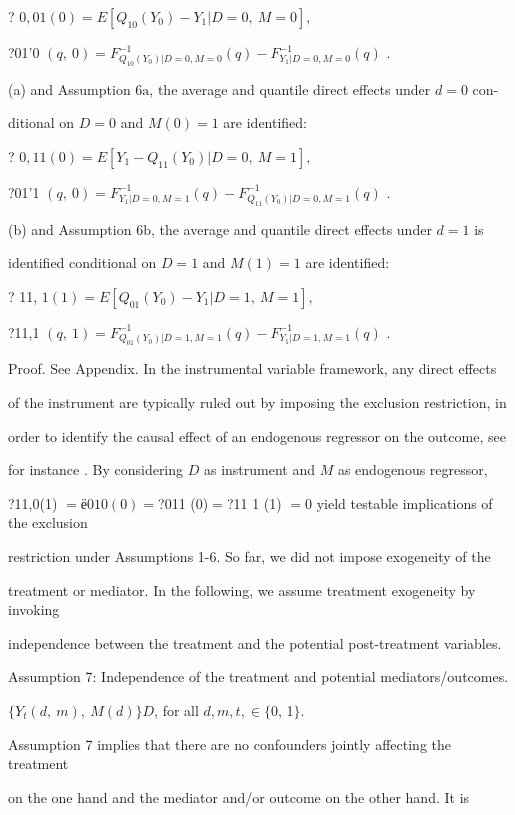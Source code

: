 \documentclass[a4paper,12pt]{article}
\begin{document}
\begin{center}
? $0,01(0)=E[Q_{10}(Y_{0})-Y_{1}|D=0,\ M=0],$

?01'0 $(q,\ 0)=F_{Q_{10}(Y_{0})|D=0,M=0}^{-1}(q)-F_{Y_{1}|D=0,M=0}^{-1}(q)$ .
\end{center}
(a) and Assumption $6\mathrm{a}$, the average and quantile direct effects under $d=0$ con-

ditional on $D=0$ and $M(0)=1$ are identified:
\begin{center}
? $0,11(0)=E[Y_{1}-Q_{11}(Y_{0})|D=0,\ M=1],$

?01'1 $(q,\ 0)=F_{Y_{1}|D=0,M=1}^{-1}(q)-F_{Q_{11}(Y_{0})|D=0,M=1}^{-1}(q)$ .
\end{center}
(b) and Assumption $6\mathrm{b}$, the average and quantile direct effects under $d = 1$ is

identified conditional on $D=1$ and $M(1)=1$ are identified:
\begin{center}
? 11, $1(1)=E[Q_{01}(Y_{0})-Y_{1}|D=1,\ M=1],$

?11,1 $(q,\ 1)=F_{Q_{01}(Y_{0})|D=1,M=1}^{-1}(q)-F_{Y_{1}|D=1,M=1}^{-1}(q)$ .
\end{center}
Proof. See Appendix. In the instrumental variable framework, any direct effects

of the instrument are typically ruled out by imposing the exclusion restriction, in

order to identify the causal effect of an endogenous regressor on the outcome, see

for instance . By considering $D$ as instrument and $M$ as endogenous regressor,

?11,0(1) $=ё 01 0(0) =$?011 (0)$=$?11 1 (1) $=0$ yield testable implications of the exclusion

restriction under Assumptions 1-6. So far, we did not impose exogeneity of the

treatment or mediator. In the following, we assume treatment exogeneity by invoking

independence between the treatment and the potential post-treatment variables.

Assumption 7: Independence of the treatment and potential mediators/outcomes.

$\{Y_{t}(d,\ m),\ M(d)\}D$, for all $d, m, t, \in\{0$, 1$\}.$

Assumption 7 implies that there are no confounders jointly affecting the treatment

on the one hand and the mediator and/or outcome on the other hand. It is
\end{document}
